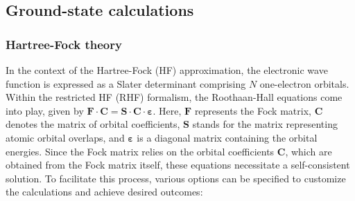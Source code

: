 \documentclass[aip,jcp,reprint,noshowkeys,superscriptaddress]{revtex4-1}
\newcommand{\FkMat}{\bm{F}}
\newcommand{\FMat}{\bm{F}}
\newcommand{\SMat}{\bm{S}}
\newcommand{\CMat}{\bm{C}}
\newcommand{\MOevMat}{\bm{\varepsilon}}
\begin{document}
\subsection{Ground-state calculations}

\subsubsection*{Hartree-Fock theory}
In the context of the Hartree-Fock (HF) approximation, the electronic wave function is expressed as a Slater determinant comprising $N$ one-electron orbitals. \cite{SzaboBook} Within the restricted HF (RHF) formalism, the Roothaan-Hall equations come into play, given by $\FkMat \cdot \CMat = \SMat \cdot \CMat \cdot \MOevMat$. Here, $\FMat$ represents the Fock matrix, $\CMat$ denotes the matrix of orbital coefficients, $\SMat$ stands for the matrix representing atomic orbital overlaps, and $\MOevMat$ is a diagonal matrix containing the orbital energies.
Since the Fock matrix relies on the orbital coefficients $\CMat$, which are obtained from the Fock matrix itself, these equations necessitate a self-consistent solution. To facilitate this process, various options can be specified to customize the calculations and achieve desired outcomes: 
\end{document}
